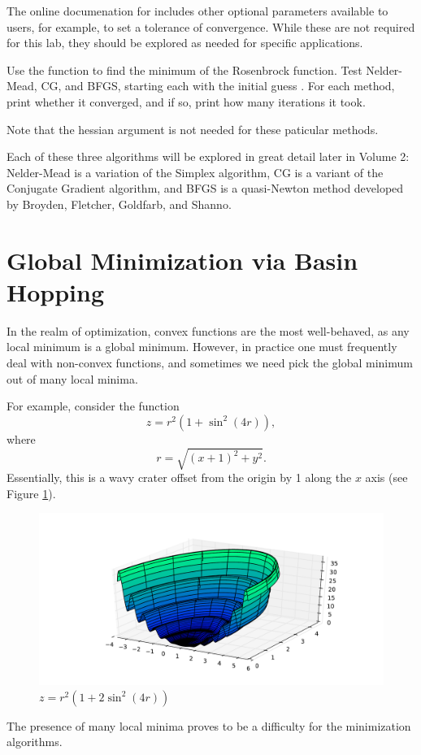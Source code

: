 The online documenation for  includes other optional parameters available to users, for example, to set a tolerance of convergence. While these are not required for this lab, they should be explored as needed for specific applications.

\begin{problem}
Use the  function to find the minimum of the Rosenbrock function.
Test Nelder-Mead, CG, and BFGS, starting each with the initial guess .
For each method, print whether it converged, and if so, print how many iterations it took.

Note that the hessian argument is not needed for these paticular methods. 
\end{problem}

Each of these three algorithms will be explored in great detail later in Volume 2: Nelder-Mead is a variation of the Simplex algorithm, CG is a variant of the Conjugate Gradient algorithm, and BFGS is a quasi-Newton method developed by Broyden, Fletcher, Goldfarb, and Shanno.

\section*{Global Minimization via Basin Hopping}

In the realm of optimization, convex functions are the most well-behaved, as any local minimum is a global minimum.
However, in practice one must frequently deal with non-convex functions, and sometimes we need pick the global minimum out of many local minima.

For example, consider the function
\[
z = r^2 (1+ \sin^2(4r)),
\]
where
\[
r = \sqrt{(x+1)^2 + y^2}.
\]
Essentially, this is a wavy crater offset from the origin by 1 along the $x$ axis (see Figure \ref{opt:multimin}).
\begin{figure}
\includegraphics[width=\textwidth]{ManyMinima.pdf}
\caption{$z = r^2 (1+ 2\sin^2(4r))$}
\label{opt:multimin}
\end{figure}
The presence of many local minima proves to be a difficulty for the minimization algorithms.

